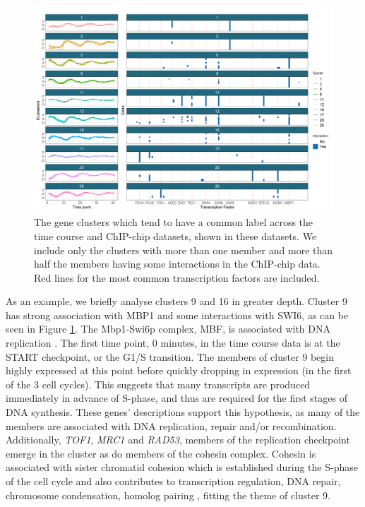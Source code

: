 \documentclass{bmcart}
\begin{document}
\begin{figure}
	\centering
	\includegraphics[scale=0.62]{./SupplementaryMaterial/Images/Yeast/timecourseChIPchipFused.png}
	\caption{The gene clusters which tend to have a common label across the time course and ChIP-chip datasets, shown in these datasets. We include only the clusters with more than one member and more than half the members having some interactions in the ChIP-chip data. Red lines for the most common transcription factors are included.}
	\label{fig:timepointChIPchipFused}
\end{figure}

As an example, we briefly analyse clusters 9 and 16 in greater depth. Cluster 9 has strong association with MBP1 and some interactions with SWI6, as can be seen in Figure \ref{fig:timepointChIPchipFused}. The Mbp1-Swi6p complex, MBF, is associated with DNA replication \citep{iyer2001genomic}. The first time point, 0 minutes, in the time course data is at the START checkpoint, or the G1/S transition. The members of cluster 9 begin highly expressed at this point before quickly dropping in expression (in the first of the 3 cell cycles). This suggests that many transcripts are produced immediately in advance of S-phase, and thus are required for the first stages of DNA synthesis. 
These genes' descriptions \citep[found using \texttt{org.Sc.sgd.db},][and shown in Table 3 of the Supplementary Material]{carlson2014org} support this hypothesis, as many of the members are associated with DNA replication, repair and/or recombination. Additionally, \emph{TOF1}, \emph{MRC1} and \emph{RAD53}, members of the replication checkpoint \citep{bando2009csm3, lao2018yeast} emerge in the cluster as do members of the cohesin complex. Cohesin is associated with sister chromatid cohesion which is established during the S-phase of the cell cycle \citep{toth1999yeast} and also contributes to transcription regulation, DNA repair, chromosome condensation, homolog pairing \citep{mehta2013cohesin}, fitting the theme of cluster 9.
\end{document}
